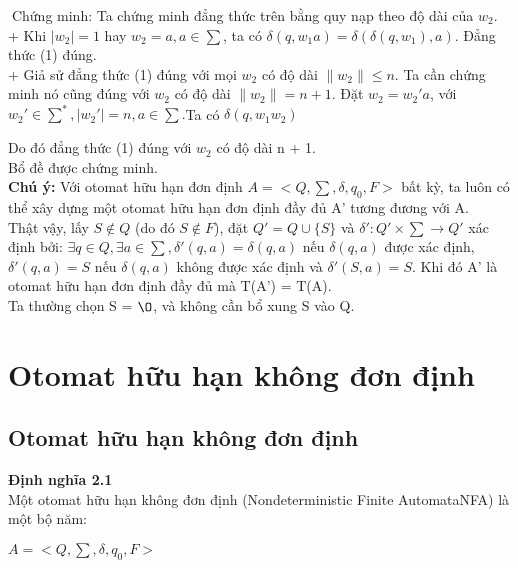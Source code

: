 \begin{flushleft}
Chứng minh: Ta chứng minh đẳng thức trên bằng quy nạp theo độ dài của $w_2$.\\
+ Khi $|w_2| = 1$ hay $w_2 = a, a \in \sum$, ta có $\delta(q, w_1a) = \delta(\delta(q, w_1),a)$. Đẳng thức (1) đúng.\\
+ Giả sử đẳng thức (1) đúng với mọi $w_2$ có độ dài $\|w_2\| \le n$. Ta cần chứng minh nó cũng đúng với $w_2$ có độ dài $\|w_2\| = n + 1$.  Đặt $w_2 = w_2'a$, với $w_2' \in \sum^*, |w_2'| = n, a \in \sum. $Ta có $\delta(q, w_1w_2)$


Do đó đẳng thức (1) đúng với $w_2$ có độ dài n + 1.\\
Bổ đề được chứng minh.\\
\textbf{Chú ý: } Với otomat hữu hạn đơn định $A = <Q, \sum, \delta, q_0, F>$ bất kỳ, ta luôn có thể xây dựng một otomat hữu hạn đơn định đầy đủ A’ tương đương với A. \\
Thật vậy, lấy $S \not \in Q$ (do đó $S \not \in F$), đặt $Q'= Q \cup \{S\}$ và $\delta': Q' \times \sum \to Q'$ xác định bởi: $\exists q \in Q, \exists a \in \sum, \delta'(q, a) = \delta(q, a)$ nếu $\delta(q, a)$ được xác định, $\delta'(q, a) = S$ nếu $\delta(q, a)$ không được xác định và $\delta'(S, a) = S$. Khi đó A' là otomat hữu hạn đơn định đầy đủ mà T(A') = T(A). \\
Ta thường chọn S = $\O$, và không cần bổ xung S vào Q.\\

\section{Otomat hữu hạn không đơn định}
\subsection{Otomat hữu hạn không đơn định}
\textbf{Định nghĩa 2.1}\\
Một otomat hữu hạn không đơn định (Nondeterministic Finite AutomataNFA) là một bộ năm:\\
\end{flushleft}
$A = <Q, \sum, \delta, q_0, F>$\\
